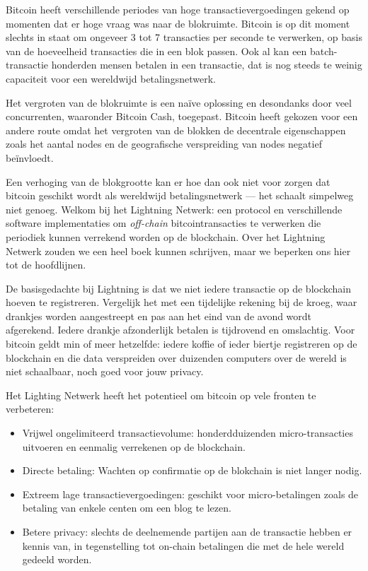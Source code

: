 Bitcoin heeft verschillende periodes van hoge transactievergoedingen gekend op momenten dat er hoge vraag was naar de blokruimte. Bitcoin is op dit moment slechts in staat om ongeveer 3 tot 7 transacties per seconde te verwerken, op basis van de hoeveelheid transacties die in een blok passen. Ook al kan een batch-transactie honderden mensen betalen in een transactie, dat is nog steeds te weinig capaciteit voor een wereldwijd betalingsnetwerk.    

Het vergroten van de blokruimte is een naïve oplossing en desondanks door veel concurrenten, waaronder Bitcoin Cash, toegepast. Bitcoin heeft gekozen voor een andere route omdat het vergroten van de blokken de decentrale eigenschappen zoals het aantal nodes en de geografische verspreiding van nodes negatief beïnvloedt. 

Een verhoging van de blokgrootte kan er hoe dan ook niet voor zorgen dat bitcoin geschikt wordt als wereldwijd betalingsnetwerk --- het schaalt simpelweg niet genoeg. Welkom bij het Lightning Netwerk: een protocol en verschillende software implementaties om \textit{off-chain} bitcointransacties te verwerken die periodiek kunnen verrekend worden op de blockchain. Over het Lightning Netwerk zouden we een heel boek kunnen schrijven, maar we beperken ons hier tot de hoofdlijnen.

De basisgedachte bij Lightning is dat we niet iedere transactie op de blockchain hoeven te registreren. Vergelijk het met een tijdelijke rekening bij de kroeg, waar drankjes worden aangestreept en pas aan het eind van de avond wordt afgerekend. Iedere drankje afzonderlijk betalen is tijdrovend en omslachtig. Voor bitcoin geldt min of meer hetzelfde: iedere koffie of ieder biertje registreren op de blockchain en die data verspreiden over duizenden computers over de wereld is niet schaalbaar, noch goed voor jouw privacy.

Het Lighting Netwerk heeft het potentieel om bitcoin op vele fronten te verbeteren:

\begin{itemize}
    \item Vrijwel ongelimiteerd transactievolume: honderdduizenden micro-transacties uitvoeren en eenmalig verrekenen op de blockchain. 
    
    \item Directe betaling: Wachten op confirmatie op de blokchain is niet langer nodig. 
    
    \item Extreem lage transactievergoedingen: geschikt voor micro-betalingen zoals de betaling van enkele centen om een blog te lezen. 
    
    \item Betere privacy: slechts de deelnemende partijen aan de transactie hebben er kennis van, in tegenstelling tot on-chain betalingen die met de hele wereld gedeeld worden.
    
\end{itemize}

